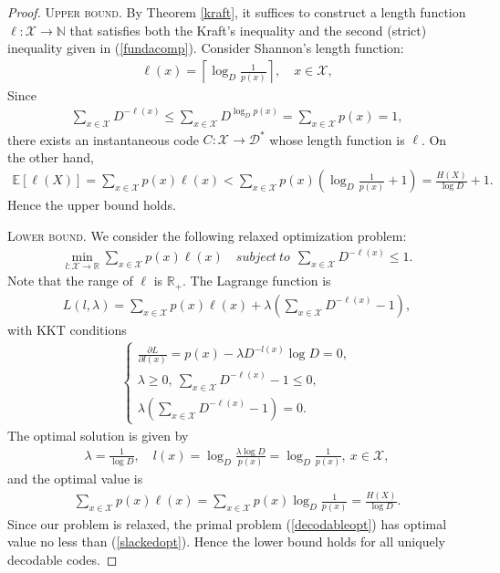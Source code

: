\documentclass{article}
\numberwithin{equation}{section}
\newcommand{\E}{\mathbb{E}}
\newcommand{\bbN}{\mathbb{N}}
\newcommand{\bbR}{\mathbb{R}}
\renewcommand{\cal}{\mathcal}
\theoremstyle{plain}
\theoremstyle{definition}
\begin{document}
\begin{proof}
\textsc{Upper bound.} By Theorem \ref{kraft}, it suffices to construct a length function $\ell:\cal{X}\to\bbN$ that satisfies both the Kraft's inequality and the second (strict) inequality given in (\ref{fundacomp}). Consider Shannon's length function:
\begin{align}
	\ell(x)=\left\lceil\log_D\frac{1}{p(x)}\right\rceil,\quad x\in\cal{X},\label{decodableopt}
\end{align}
Since
\begin{align*}
	\sum_{x\in\cal{X}}D^{-\ell(x)}\leq\sum_{x\in\cal{X}}D^{\log_D p(x)}=\sum_{x\in\cal{X}}p(x)=1,
\end{align*}
there exists an instantaneous code $C:\cal{X}\to\cal{D}^*$ whose length function is $\ell$. On the other hand,
\begin{align*}
	\E[\ell(X)]=\sum_{x\in\cal{X}}p(x)\ell(x)<\sum_{x\in\cal{X}}p(x)\left(\log_D\frac{1}{p(x)}+1\right)=\frac{H(X)}{\log D}+1.
\end{align*}
Hence the upper bound holds.

\textsc{Lower bound.} We consider the following relaxed optimization problem:
\begin{align*}
	\min_{l:\cal{X}\to\bbR}\sum_{x\in\cal{X}}p(x)\ell(x)\quad subject\ to\ \ \sum_{x\in\cal{X}}D^{-\ell(x)}\leq 1.
\end{align*}
Note that the range of $\ell$ is $\bbR_+$. The Lagrange function is
\begin{align*}
	L(l,\lambda)=\sum_{x\in\cal{X}}p(x)\ell(x)+\lambda\left(\sum_{x\in\cal{X}}D^{-\ell(x)}- 1\right),
\end{align*}
with KKT conditions
\begin{align*}
\begin{cases}
\frac{\partial L}{\partial l(x)}=p(x)-\lambda D^{-l(x)}\log D=0,\\
\lambda\geq 0,\ \sum_{x\in\cal{X}}D^{-\ell(x)}- 1\leq 0,\\
\lambda\left(\sum_{x\in\cal{X}}D^{-\ell(x)}- 1\right)=0.
\end{cases}
\end{align*}
The optimal solution is given by
\begin{align*}
	\lambda=\frac{1}{\log D},\quad l(x)=\log_D\frac{\lambda\log D}{p(x)}=\log_D\frac{1}{p(x)},\ x\in\cal{X},
\end{align*}
and the optimal value is
\begin{align}
	\sum_{x\in\cal{X}}p(x)\ell(x)=\sum_{x\in\cal{X}}p(x)\log_D\frac{1}{p(x)}=\frac{H(X)}{\log D}.\label{slackedopt}
\end{align}
Since our problem is relaxed, the primal problem (\ref{decodableopt}) has optimal value no less than (\ref{slackedopt}). Hence the lower bound holds for all uniquely decodable codes.
\end{proof}
\end{document}
